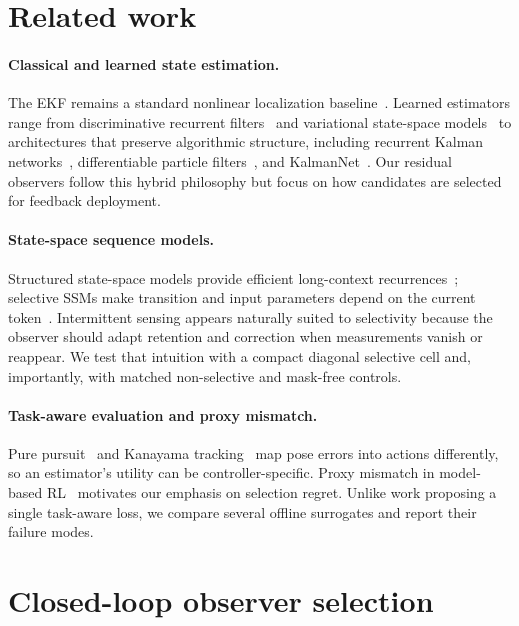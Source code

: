 \documentclass{article}
\begin{document}
\section{Related work}
\paragraph{Classical and learned state estimation.}
The EKF remains a standard nonlinear localization baseline~\citep{thrun2005probabilistic}. Learned estimators range from discriminative recurrent filters~\citep{ha2016backprop} and variational state-space models~\citep{karl2017dvbf,rubanova2019latentode} to architectures that preserve algorithmic structure, including recurrent Kalman networks~\citep{becker2019rkn}, differentiable particle filters~\citep{jonschkowski2018dpf}, and KalmanNet~\citep{revach2022kalmannet}. Our residual observers follow this hybrid philosophy but focus on how candidates are selected for feedback deployment.

\paragraph{State-space sequence models.}
Structured state-space models provide efficient long-context recurrences~\citep{gu2022s4}; selective SSMs make transition and input parameters depend on the current token~\citep{gu2024mamba}. Intermittent sensing appears naturally suited to selectivity because the observer should adapt retention and correction when measurements vanish or reappear. We test that intuition with a compact diagonal selective cell and, importantly, with matched non-selective and mask-free controls.

\paragraph{Task-aware evaluation and proxy mismatch.}
Pure pursuit~\citep{coulter1992pure} and Kanayama tracking~\citep{kanayama1990stable} map pose errors into actions differently, so an estimator's utility can be controller-specific. Proxy mismatch in model-based RL~\citep{lambert2020objective} motivates our emphasis on selection regret. Unlike work proposing a single task-aware loss, we compare several offline surrogates and report their failure modes.

\section{Closed-loop observer selection}
\end{document}
